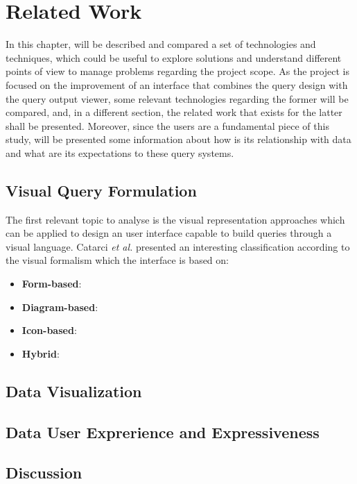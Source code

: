 \chapter{Related Work}
\label{cha:related_work}
In this chapter, will be described and compared a set of technologies and techniques, which could be useful to explore solutions and understand different points of view to manage problems regarding the project scope. As the project is focused on the improvement of an interface that combines the query design with the query output viewer, some relevant technologies regarding the former will be compared, and, in a different section, the related work that exists for the latter shall be presented. Moreover, since the users are a fundamental piece of this study, will be presented some information about how is its relationship with data and what are its expectations to these query systems.

\section{Visual Query Formulation}
\label{sec:visual_query_formulation}

The first relevant topic to analyse is the visual representation approaches which can be applied to design an user interface capable to build queries through a visual language. Catarci \textit{et al.} \cite{visualQuerySystemsForDatabases_aSurvey} presented an interesting classification according to the visual formalism which the interface is based on:

\begin{itemize}
    \item \textbf{Form-based}: 
    \item \textbf{Diagram-based}: 
    \item \textbf{Icon-based}: 
    \item \textbf{Hybrid}: 
\end{itemize}

\section{Data Visualization}
\label{sec:data_visualization}

\section{Data User Exprerience and Expressiveness}
\label{sec:data_user_experience_and_expressiveness}

\section{Discussion}
\label{sec:discussion}